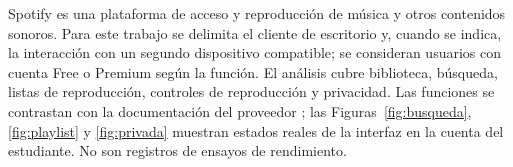 Spotify es una plataforma de acceso y reproducción de música y otros contenidos sonoros. Para este trabajo se delimita el cliente de escritorio y, cuando se indica, la interacción con un segundo dispositivo compatible; se consideran usuarios con cuenta Free o Premium según la función. El análisis cubre biblioteca, búsqueda, listas de reproducción, controles de reproducción y privacidad. Las funciones se contrastan con la documentación del proveedor \cite{spotify-playlists,spotify-search,spotify-private,spotify-connect}; las Figuras~\ref{fig:busqueda}, \ref{fig:playlist} y \ref{fig:privada} muestran estados reales de la interfaz en la cuenta del estudiante. No son registros de ensayos de rendimiento.
